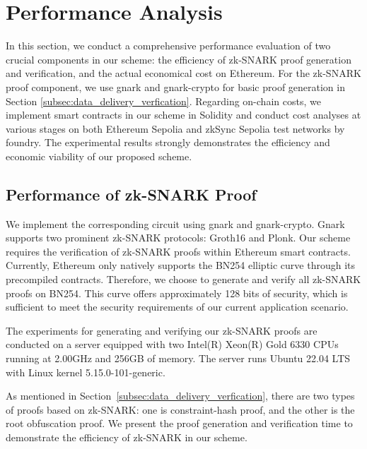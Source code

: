 \documentclass[journal]{IEEEtran}
\begin{document}
\section{Performance Analysis}\label{section:performance_analysis}
In this section, we conduct a comprehensive performance evaluation of two crucial components in our scheme: the efficiency of zk-SNARK proof generation and verification, and the actual economical cost on Ethereum. For the zk-SNARK proof component, we use gnark\cite{gnark} and gnark-crypto\cite{gnark-crypto} for basic proof generation in Section \ref{subsec:data_delivery_verfication}. Regarding on-chain costs, we implement smart contracts in our scheme in Solidity and conduct cost analyses at various stages on both Ethereum Sepolia and zkSync Sepolia test networks by foundry\cite{foundry}. The experimental results strongly demonstrates the efficiency and economic viability of our proposed scheme.

\subsection{ Performance of zk-SNARK Proof}

We implement the corresponding circuit using gnark\cite{gnark} and gnark-crypto\cite{gnark-crypto}. Gnark supports two prominent zk-SNARK protocols: Groth16\cite{groth2016size} and Plonk\cite{gabizon2019Plonk}. Our scheme requires the verification of zk-SNARK proofs within Ethereum smart contracts. Currently, Ethereum only natively supports the BN254 elliptic curve through its precompiled contracts. Therefore, we choose to generate and verify all zk-SNARK proofs on BN254. This curve offers approximately 128 bits of security, which is sufficient to meet the security requirements of our current application scenario.



The experiments for generating and verifying our zk-SNARK proofs are conducted on a server equipped with two Intel(R) Xeon(R) Gold 6330 CPUs running at 2.00GHz and 256GB of memory. The server runs Ubuntu 22.04 LTS with Linux kernel 5.15.0-101-generic. 

As mentioned in Section~\ref{subsec:data_delivery_verfication}, there are two types of proofs based on zk-SNARK: one is constraint-hash proof, and the other is the root obfuscation proof. We present the proof generation and verification time to demonstrate the efficiency of zk-SNARK in our scheme.
\end{document}

